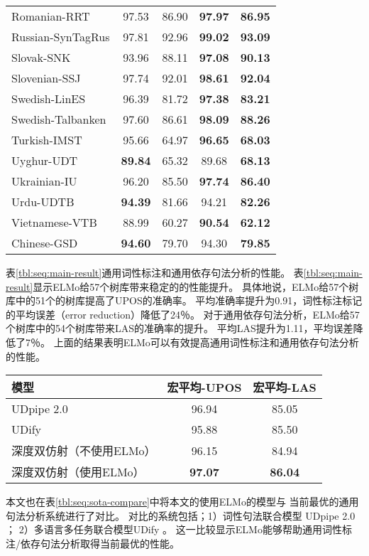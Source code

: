 \begin{longtable}{p{5cm}cccc}
Romanian-RRT & 97.53 & 86.90 & \bf 97.97 & \bf 86.95 \\
Russian-SynTagRus & 97.81 & 92.96 & \bf 99.02 & \bf 93.09 \\
Slovak-SNK & 93.96 & 88.11 & \bf 97.08 & \bf 90.13 \\
Slovenian-SSJ & 97.74 & 92.01 & \bf 98.61 & \bf 92.04 \\
Swedish-LinES & 96.39 & 81.72 & \bf 97.38 & \bf 83.21 \\
Swedish-Talbanken & 97.60 & 86.61 & \bf 98.09 & \bf 88.26 \\
Turkish-IMST & 95.66 & 64.97 & \bf 96.65 & \bf 68.03 \\
Uyghur-UDT & \bf 89.84 & 65.32 & 89.68 & \bf 68.13 \\
Ukrainian-IU & 96.20 & 85.50 & \bf 97.74 & \bf 86.40 \\
Urdu-UDTB & \bf 94.39 & 81.66 & 94.21 & \bf 82.26 \\
Vietnamese-VTB & 88.99 & 60.27 & \bf 90.54 & \bf 62.12 \\
Chinese-GSD & \bf 94.60 & 79.70 & 94.30 & \bf 79.85 \\
\end{longtable}\normalsize

表\ref{tbl:seq:main-result}通用词性标注和通用依存句法分析的性能。
表\ref{tbl:seq:main-result}显示ELMo给57个树库带来稳定的的性能提升。
具体地说，ELMo给57个树库中的51个的树库提高了UPOS的准确率。
平均准确率提升为0.91，词性标注标记的平均误差（error reduction）降低了24％。
对于通用依存句法分析，ELMo给57个树库中的54个树库带来LAS的准确率的提升。
平均LAS提升为1.11，平均误差降低了7％。
上面的结果表明ELMo可以有效提高通用词性标注和通用依存句法分析的性能。

\begin{table}[t]
	\vspace{0.5em}\centering\wuhao
	\begin{tabular}{lcc}
		\toprule[1.5pt]
		模型 & 宏平均-UPOS & 宏平均-LAS \\
		\midrule[1pt]
		UDpipe 2.0 \cite{K18-2020} & 96.94 & 85.05 \\
		UDify \cite{DBLP:journals/corr/abs-1904-02099} & 95.88 & 85.50 \\
		深度双仿射（不使用ELMo） & 96.15 & 84.94 \\
		深度双仿射（使用ELMo） & \bf 97.07 & \bf 86.04 \\
		\bottomrule[1.5pt]
	\end{tabular}
\end{table}
本文也在表\ref{tbl:seq:sota-compare}中将本文的使用ELMo的模型与
当前最优的通用句法分析系统进行了对比。
对比的系统包括；1）词性句法联合模型 UDpipe 2.0 \cite{K18-2020}；
2）多语言多任务联合模型UDify \cite{DBLP:journals/corr/abs-1904-02099}。
这一比较显示ELMo能够帮助通用词性标注/依存句法分析取得当前最优的性能。

